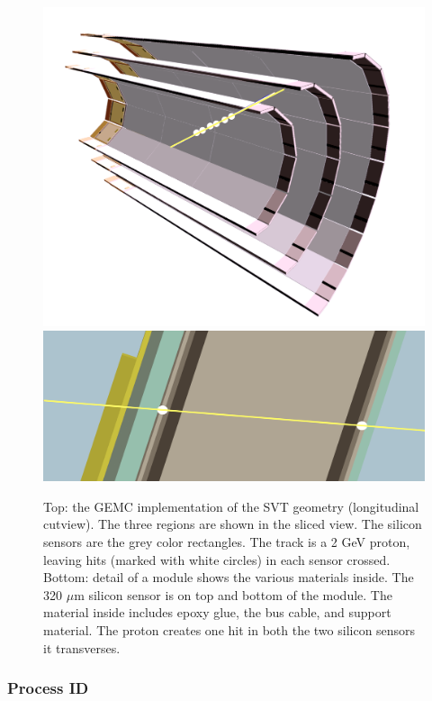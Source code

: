 \begin{figure}
	\centering
	\includegraphics[width=0.99\columnwidth,keepaspectratio]{img/bstGeometry.png}
	\includegraphics[width=0.99\columnwidth,keepaspectratio]{img/bstDetail.png}
	\caption{Top: the GEMC implementation of the SVT geometry (longitudinal cutview).
	         The three regions are shown in the sliced view. The silicon sensors are
             the grey color rectangles. The track is a 2 GeV proton, leaving hits (marked with white circles)
			 in each sensor crossed. Bottom: detail of a module shows
             the various materials inside. The 320 $\mu$m silicon sensor is on top and bottom of the module.
             The material inside includes epoxy glue, the bus cable, and support material. The proton creates one hit
		     in both the two silicon sensors it transverses.}
	\label{fig:bstGeometry}
\end{figure}


\subsubsection{Process ID}

